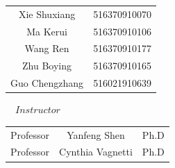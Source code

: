 \documentclass{article}
\begin{document}
\normalsize
\vspace*{0.5em}
\begin{center}
    \large
\begin{tabular}{cl}
\large
\vspace{0.3em} Xie Shuxiang&516370910070\vspace{0.3em}\\ 
\large
Ma Kerui\vspace{0.3em} &516370910106 \vspace{0.3em}\\ 
\large
Wang Ren\vspace{0.3em} &516370910177 \vspace{0.3em}\\ 
\large
Zhu Boying\vspace{0.3em} &516370910165 \vspace{0.3em}\\ 
\large
Guo Chengzhang\vspace{0.3em} &516021910639 \vspace{0.3em}\\ 
 
\end{tabular}
\end{center}

\normalsize
\vspace*{1em}
\begin{center}
\large
$\hspace{1em}Instructor$\\
\vspace*{1em}
\begin{tabular}{lcl}
\large
Professor\hspace{0.5em}\vspace{0.3em} &\hspace{0.5em}Yanfeng Shen\hspace{0.5em}&\hspace{0.5em}Ph.D\\ 
Professor\hspace{0.5em} &\hspace{0.5em}Cynthia Vagnetti \hspace{0.5em}&\hspace{0.5em}Ph.D\\ 
\end{tabular}
\end{center}






\newpage
\tableofcontents
\end{document}
